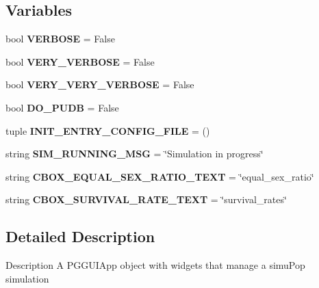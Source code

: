 \subsection*{Variables}
\begin{DoxyCompactItemize}
\item 
bool {\bfseries V\+E\+R\+B\+O\+SE} = False\hypertarget{namespacenegui_1_1pgguisimupop__experimental_ad0588acea3a1f72262c03c3bd86c2be7}{}\label{namespacenegui_1_1pgguisimupop__experimental_ad0588acea3a1f72262c03c3bd86c2be7}

\item 
bool {\bfseries V\+E\+R\+Y\+\_\+\+V\+E\+R\+B\+O\+SE} = False\hypertarget{namespacenegui_1_1pgguisimupop__experimental_af847a11d6a8ce7d3440cc47b9de0da29}{}\label{namespacenegui_1_1pgguisimupop__experimental_af847a11d6a8ce7d3440cc47b9de0da29}

\item 
bool {\bfseries V\+E\+R\+Y\+\_\+\+V\+E\+R\+Y\+\_\+\+V\+E\+R\+B\+O\+SE} = False\hypertarget{namespacenegui_1_1pgguisimupop__experimental_aebde978cdfae7c3cdfa66edbcee6c6fe}{}\label{namespacenegui_1_1pgguisimupop__experimental_aebde978cdfae7c3cdfa66edbcee6c6fe}

\item 
bool {\bfseries D\+O\+\_\+\+P\+U\+DB} = False\hypertarget{namespacenegui_1_1pgguisimupop__experimental_af566a99e376ec8e83423439241a4c7e2}{}\label{namespacenegui_1_1pgguisimupop__experimental_af566a99e376ec8e83423439241a4c7e2}

\item 
tuple {\bfseries I\+N\+I\+T\+\_\+\+E\+N\+T\+R\+Y\+\_\+\+C\+O\+N\+F\+I\+G\+\_\+\+F\+I\+LE} = ()\hypertarget{namespacenegui_1_1pgguisimupop__experimental_af24aa58e88cc900d0a89a64465c990b8}{}\label{namespacenegui_1_1pgguisimupop__experimental_af24aa58e88cc900d0a89a64465c990b8}

\item 
string {\bfseries S\+I\+M\+\_\+\+R\+U\+N\+N\+I\+N\+G\+\_\+\+M\+SG} = \char`\"{}Simulation in progress\char`\"{}\hypertarget{namespacenegui_1_1pgguisimupop__experimental_a5e1b6d1018d1e17cda0cb7be1cba1707}{}\label{namespacenegui_1_1pgguisimupop__experimental_a5e1b6d1018d1e17cda0cb7be1cba1707}

\item 
string {\bfseries C\+B\+O\+X\+\_\+\+E\+Q\+U\+A\+L\+\_\+\+S\+E\+X\+\_\+\+R\+A\+T\+I\+O\+\_\+\+T\+E\+XT} = \char`\"{}equal\+\_\+sex\+\_\+ratio\char`\"{}\hypertarget{namespacenegui_1_1pgguisimupop__experimental_aa8e753066d25f1a88cd8b4dbe994e1bc}{}\label{namespacenegui_1_1pgguisimupop__experimental_aa8e753066d25f1a88cd8b4dbe994e1bc}

\item 
string {\bfseries C\+B\+O\+X\+\_\+\+S\+U\+R\+V\+I\+V\+A\+L\+\_\+\+R\+A\+T\+E\+\_\+\+T\+E\+XT} = \char`\"{}survival\+\_\+rates\char`\"{}\hypertarget{namespacenegui_1_1pgguisimupop__experimental_a05c3a1888de52cb419871c49f5274a34}{}\label{namespacenegui_1_1pgguisimupop__experimental_a05c3a1888de52cb419871c49f5274a34}

\end{DoxyCompactItemize}


\subsection{Detailed Description}
\begin{DoxyVerb}Description
A PGGUIApp object with widgets that manage a simuPop simulation
\end{DoxyVerb}
 